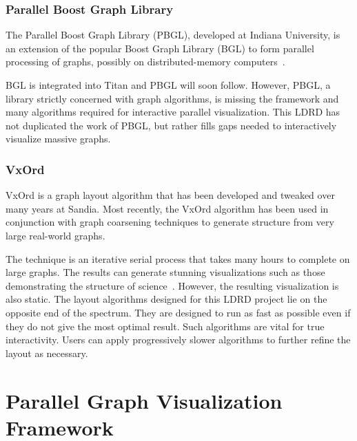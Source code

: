 \documentclass[pdf,12pt,report,strict]{SANDreport}
\newcommand*{\lcite}[1]{~\cite{#1}}
\newcommand{\titan}{Titan\index{Titan}\xspace}
\begin{document}

\subsection{Parallel Boost Graph Library}
\label{sec:RelatedProjects:PBGL}


The Parallel Boost Graph Library (PBGL), developed at Indiana University,
is an extension of the popular Boost Graph Library (BGL) to form parallel
processing of graphs, possibly on distributed-memory
computers\lcite{Gregor05}.

BGL is integrated into \titan and PBGL will soon follow.  However, PBGL, a
library strictly concerned with graph algorithms, is missing the framework
and many algorithms required for interactive parallel visualization.  This
LDRD has not duplicated the work of PBGL, but rather fills gaps needed to
interactively visualize massive graphs.


\subsection{VxOrd}
\label{sec:RelatedProjects:VxOrd}


VxOrd is a graph layout algorithm that has been developed and tweaked over
many years at Sandia.  Most recently, the VxOrd algorithm has been used in
conjunction with graph coarsening techniques to generate structure from
very large real-world graphs.

The technique is an iterative serial process that takes many hours to
complete on large graphs.  The results can generate stunning visualizations
such as those demonstrating the structure of
science\lcite{Boyack04,Boyack05}.  However, the resulting visualization is
also static.  The layout algorithms designed for this LDRD project lie on
the opposite end of the spectrum.  They are designed to run as fast as
possible even if they do not give the most optimal result.  Such algorithms
are vital for true interactivity.  Users can apply progressively slower
algorithms to further refine the layout as necessary.



\chapter{Parallel Graph Visualization Framework}
\label{chap:ParallelGraphVisualizationFramework}
\end{document}
